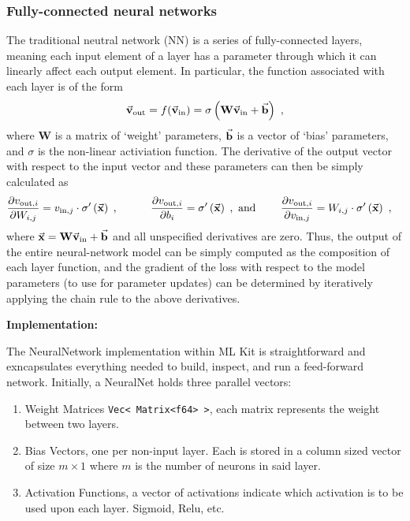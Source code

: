 \subsubsection{Fully-connected neural networks}
The traditional neutral network (NN) is a series of fully-connected layers, meaning each input element of a layer has a parameter through which it can linearly affect each output element.
In particular, the function associated with each layer is of the form \textcolor{blue}{\autocite{Nielsen_2015}}
\begin{equation*}
  \begin{aligned}
    \vec{\mathbf{v}}_{\text{out}} = f(\vec{\mathbf{v}}_{\text{in}}) = \sigma\left(\mathbf{W}\vec{\mathbf{v}}_{\text{in}} + \vec{\mathbf{b}}\right) ~,
  \end{aligned}
\end{equation*}
where $\mathbf{W}$ is a matrix of `weight' parameters, $\vec{\mathbf{b}}$ is a vector of `bias' parameters, and $\sigma$ is the non-linear activiation function.
The derivative of the output vector with respect to the input vector and these parameters can then be simply calculated as
\begin{equation*}
  \begin{aligned}
    \frac{\partial v_{\text{out}, i}}{\partial W_{i, j}} = v_{\text{in}, j} \cdot \sigma'\left(\vec{\mathbf{x}}\right)\hspace{3pt}, \hspace{30pt} \frac{\partial v_{\text{out}, i}}{\partial b_{i}} & = \sigma'\left(\vec{\mathbf{x}}\right)\hspace{3pt},\text{ and} \hspace{23pt} \frac{\partial v_{\text{out}, i}}{\partial v_{\text{in}, j}} = W_{i, j} \cdot \sigma'\left(\vec{\mathbf{x}}\right) ~,
  \end{aligned}
\end{equation*}
where $\vec{\mathbf{x}} = \mathbf{W}\vec{\mathbf{v}}_{\text{in}} + \vec{\mathbf{b}}$ and all unspecified derivatives are zero.
Thus, the output of the entire neural-network model can be simply computed as the composition of each layer function, and the gradient of the loss with respect to the model parameters (to use for parameter updates) can be determined by iteratively applying the chain rule to the above derivatives.

\begin{center}
 \textbf{Implementation:}
\end{center}
The NeuralNetwork implementation within ML Kit is straightforward and exncapsulates everything needed to build, inspect, and run a feed-forward network.
Initially, a NeuralNet holds three parallel vectors: 
\begin{enumerate}
  \item Weight Matrices \texttt{Vec<\,Matrix<f64>\,>}, each matrix represents the weight between two layers.
  \item Bias Vectors, one per non-input layer. Each is stored in a column sized vector of size $m \times 1$ where $m$ is the number of neurons in said layer.
  \item Activation Functions, a vector of activations indicate which activation is to be used upon each layer. Sigmoid, Relu, etc. 
\end{enumerate}

